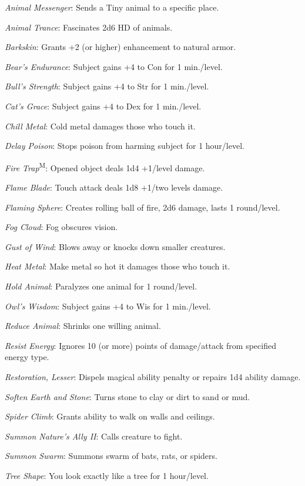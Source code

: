\textit{Animal Messenger}: Sends a Tiny animal to a specific place.

\textit{Animal Trance}: Fascinates 2d6 HD of animals.

\textit{Barkskin}: Grants +2 (or higher) enhancement to natural armor.

\textit{Bear's Endurance}: Subject gains +4 to Con for 1 min./level.

\textit{Bull's Strength}: Subject gains +4 to Str for 1 min./level.

\textit{Cat's Grace}: Subject gains +4 to Dex for 1 min./level.

\textit{Chill Metal}: Cold metal damages those who touch it.

\textit{Delay Poison}: Stops poison from harming subject for 1 hour/level.

\textit{Fire Trap}\textsuperscript{M}: Opened object deals 1d4 +1/level damage.

\textit{Flame Blade}: Touch attack deals 1d8 +1/two levels damage.

\textit{Flaming Sphere}: Creates rolling ball of fire, 2d6 damage, lasts 1 round/level.

\textit{Fog Cloud}: Fog obscures vision.

\textit{Gust of Wind}: Blows away or knocks down smaller creatures.

\textit{Heat Metal}: Make metal so hot it damages those who touch it.

\textit{Hold Animal}: Paralyzes one animal for 1 round/level.

\textit{Owl's Wisdom}: Subject gains +4 to Wis for 1 min./level.

\textit{Reduce Animal}: Shrinks one willing animal.

\textit{Resist Energy}: Ignores 10 (or more) points of damage/attack from specified energy type.

\textit{Restoration, Lesser}: Dispels magical ability penalty or repairs 1d4 ability damage.

\textit{Soften Earth and Stone}: Turns stone to clay or dirt to sand or mud.

\textit{Spider Climb}: Grants ability to walk on walls and ceilings.

\textit{Summon Nature's Ally II}: Calls creature to fight.

\textit{Summon Swarm}: Summons swarm of bats, rats, or spiders.

\textit{Tree Shape}: You look exactly like a tree for 1 hour/level.

